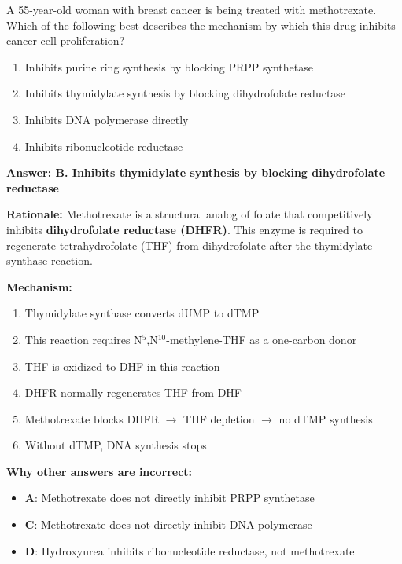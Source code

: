 \begin{exercise}
A 55-year-old woman with breast cancer is being treated with methotrexate. Which of the following best describes the mechanism by which this drug inhibits cancer cell proliferation?
\begin{enumerate}[label=\Alph*.]
    \item Inhibits purine ring synthesis by blocking PRPP synthetase
    \item Inhibits thymidylate synthesis by blocking dihydrofolate reductase
    \item Inhibits DNA polymerase directly
    \item Inhibits ribonucleotide reductase
\end{enumerate}
\end{exercise}

\begin{solution}
\textbf{Answer: B. Inhibits thymidylate synthesis by blocking dihydrofolate reductase}

\textbf{Rationale:} Methotrexate is a structural analog of folate that competitively inhibits \textbf{dihydrofolate reductase (DHFR)}. This enzyme is required to regenerate tetrahydrofolate (THF) from dihydrofolate after the thymidylate synthase reaction.

\textbf{Mechanism:}
\begin{enumerate}
    \item Thymidylate synthase converts dUMP to dTMP
    \item This reaction requires N$^{5}$,N$^{10}$-methylene-THF as a one-carbon donor
    \item THF is oxidized to DHF in this reaction
    \item DHFR normally regenerates THF from DHF
    \item Methotrexate blocks DHFR $\rightarrow$ THF depletion $\rightarrow$ no dTMP synthesis
    \item Without dTMP, DNA synthesis stops
\end{enumerate}

\textbf{Why other answers are incorrect:}
\begin{itemize}
    \item \textbf{A}: Methotrexate does not directly inhibit PRPP synthetase
    \item \textbf{C}: Methotrexate does not directly inhibit DNA polymerase
    \item \textbf{D}: Hydroxyurea inhibits ribonucleotide reductase, not methotrexate
\end{itemize}
\end{solution}

